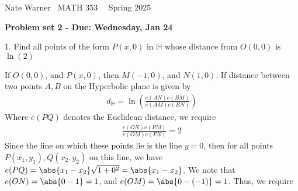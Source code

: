 \documentclass{report}
\title{\Huge{}}
\author{\huge{Nathan Warner}}
\date{\huge{}}
\begin{document}
    \pagebreak \bigbreak \noindent
    Nate Warner \ \quad \quad \quad \quad \quad \quad \quad \quad \quad \quad \quad \quad  MATH 353 \quad  \quad \quad \quad \quad \quad \quad \quad \quad \ \ \quad \quad Spring 2025
    \begin{center}
        \textbf{Problem set 2 - Due: Wednesday, Jan 24}
    \end{center}
    \bigbreak \noindent 
    \begin{mdframed}
        1. Find all points of the form $P(x,0)$ in $\mathbb{H}$ whose distance from $O(0,0)$ is $\ln(2)$
    \end{mdframed}
    \bigbreak \noindent 
    If $O(0,0)$, and $P(x,0)$, then $M(-1,0)$, and $N(1,0)$. If distance between two points $A,B$ on the Hyperbolic plane is given by
    \begin{align*}
        d_{\mathbb{H}} = \ln{\left(\frac{e(AN)e(BM)}{e(AM)e(BN)}\right)}
    \end{align*}
    Where $e(PQ)$ denotes the Euclidean distance, we require
    \begin{align*}
       \frac{e(ON)e(PM)}{e(OM)e(PN)}  = 2
    \end{align*}
    Since the line on which these points lie is the line $y= 0$, then for all points $P(x_{1}, y_{1}), Q(x_{2}, y_{2})$ on this line, we have $e(PQ) = \abs{x_{1} -x_{2}}\sqrt{1+0^{2}} = \abs{x_{1} - x_{2}}$. We note that $e(ON) = \abs{0-1} =1$, and $e(OM) = \abs{0 - (-1)} = 1 $. Thus, we require
\end{document}
